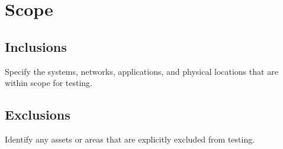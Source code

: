 \section*{Scope}
\subsection*{Inclusions}
Specify the systems, networks, applications, and physical locations that are within scope for testing.
\subsection*{Exclusions}
Identify any assets or areas that are explicitly excluded from testing.
